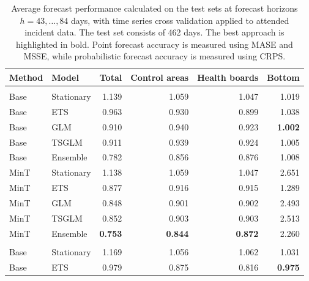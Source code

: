 \documentclass[
  authoryear,
  preprint,
  3p]{elsarticle}
\begin{document}
\hypertarget{tbl-result}{}
\begin{table}
\caption{\label{tbl-result}Average forecast performance calculated on the test sets at forecast
horizons \(h=43,\dots,84\) days, with time series cross validation
applied to attended incident data. The test set consists of 462 days.
The best approach is highlighted in bold. Point forecast accuracy is
measured using MASE and MSSE, while probabilistic forecast accuracy is
measured using CRPS. }\tabularnewline

\centering
\begin{tabular}{llrrrr}
\toprule
Method & Model & Total & Control areas & Health boards & Bottom\\
\midrule
\addlinespace[0.3em]
\multicolumn{6}{l}{\textbf{MSSE}}\\
\hspace{1em}Base & Stationary & 1.139 & 1.059 & 1.047 & 1.019\\
\hspace{1em}Base & ETS & 0.963 & 0.930 & 0.899 & 1.038\\
\hspace{1em}Base & GLM & 0.910 & 0.940 & 0.923 & \textbf{1.002}\\
\hspace{1em}Base & TSGLM & 0.911 & 0.939 & 0.924 & 1.005\\
\hspace{1em}Base & Ensemble & 0.782 & 0.856 & 0.876 & 1.008\\
\hspace{1em}MinT & Stationary & 1.138 & 1.059 & 1.047 & 2.651\\
\hspace{1em}MinT & ETS & 0.877 & 0.916 & 0.915 & 1.289\\
\hspace{1em}MinT & GLM & 0.848 & 0.901 & 0.902 & 2.493\\
\hspace{1em}MinT & TSGLM & 0.852 & 0.903 & 0.903 & 2.513\\
\hspace{1em}MinT & Ensemble & \textbf{0.753} & \textbf{0.844} & \textbf{0.872} & 2.260\\
\addlinespace[0.3em]
\hline
\multicolumn{6}{l}{\textbf{MASE}}\\
\hspace{1em}Base & Stationary & 1.169 & 1.056 & 1.062 & 1.031\\
\hspace{1em}Base & ETS & 0.979 & 0.875 & 0.816 & \textbf{0.975}\\

\end{tabular}
\end{table}
\end{document}
